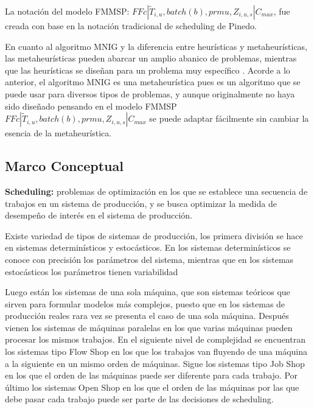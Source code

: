\documentclass{article}
\def\notac_modelo{$FFc | \tilde{T}_{i, u}, batch(b), prmu, Z_{i, u, s} | C_{max}$}
\begin{document}
La notación del modelo FMMSP: \notac_modelo, fue creada con base en la notación tradicional de scheduling de Pinedo. \autocite{schedPinedo}

\vspace{\baselineskip}
En cuanto al algoritmo MNIG y la diferencia entre heurísticas y metaheurísticas, las metaheurísticas pueden abarcar un amplio abanico de problemas, mientras que las heurísticas se diseñan para un problema muy específico \autocite{metaTalbi}. Acorde a lo anterior, el algoritmo MNIG es una metaheurística pues es un algoritmo que se puede usar para diversos tipos de problemas, y aunque originalmente no haya sido diseñado pensando en el modelo FMMSP \linebreak \notac_modelo se puede adaptar fácilmente sin cambiar la esencia de la metaheurística.

\subsection{Marco Conceptual}

\indent\indent
\textbf{Scheduling:} problemas de optimización en los que se establece una secuencia de trabajos en un sistema de producción, y se busca optimizar la medida de desempeño de interés en el sistema de producción.

\vspace{\baselineskip}
Existe variedad de tipos de sistemas de producción, los primera división se hace en sistemas determinísticos y estocásticos. En los sistemas determinísticos se conoce con precisión los parámetros del sistema, mientras que en los sistemas estocásticos los parámetros tienen variabilidad \autocite{schedPinedo}

\vspace{\baselineskip}
Luego están los sistemas de una sola máquina, que son sistemas teóricos que sirven para formular modelos más complejos, puesto que en los sistemas de producción reales rara vez se presenta el caso de una sola máquina. Después vienen los sistemas de máquinas paralelas en los que varias máquinas pueden procesar los mismos trabajos. En el siguiente nivel de complejidad se encuentran los sistemas tipo Flow Shop en los que los trabajos van fluyendo de una máquina a la siguiente en un mismo orden de máquinas. Sigue los sistemas tipo Job Shop en los que el orden de las máquinas puede ser diferente para cada trabajo. Por último los sistemas Open Shop en los que el orden de las máquinas por las que debe pasar cada trabajo puede ser parte de las decisiones de scheduling. \autocite{schedPinedo}
\end{document}
